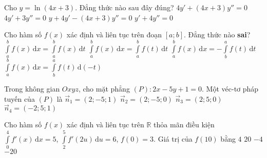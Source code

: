 \begin{ex}%
	Cho $y=\ln (4x+3)$. Đẳng thức nào sau đây đúng?
	\choice
	{\True $4y'+(4x+3)y''=0 $}
	{$4y'+3y''=0 $}
	{$y+4y'-(4x+3)y''=0 $}
	{$y'+4y''=0 $}
\end{ex}
\begin{ex}%
	Cho hàm số $f(x)$ xác định và liên tục trên đoạn $[a;b]$. Đẳng thức nào \textbf{sai}?
	\choice
	{\True $\displaystyle\int\limits_a^b f(x) \mathrm{\,d}x=\int\limits_a^b f(x) \mathrm{\,d}t $}
	{$\displaystyle\int\limits_a^b f(x) \mathrm{\,d}x=\int\limits_a^b f(t) \mathrm{\,d}t $}
	{$\displaystyle\int\limits_a^b f(x) \mathrm{\,d}x=-\int\limits_b^a f(t) \mathrm{\,d}t $}
	{$\displaystyle\int\limits_a^b f(x) \mathrm{\,d}x=\int\limits_b^a f(t) \mathrm{\,d}(-t) $}
\end{ex}
\begin{ex}%
	Trong không gian $Oxyz$, cho mặt phẳng $(P)\colon 2x-5y+1=0$. Một véc-tơ pháp tuyến của $(P)$ là
	\choice
	{$\vec{n}_1=(2;-5;1) $}
	{\True $\vec{n}_2=(2;-5;0) $}
	{$\vec{n}_3=(2;5;0) $}
	{$\vec{n}_4=(-2;5;1) $}
\end{ex}
\begin{ex}%
	Cho hàm số $f(x)$ xác định và liên tục trên $\mathbb{R}$ thỏa mãn điều kiện $\displaystyle \int \limits_0^4 f'(x)\mathrm{\,d}x=5$, $\displaystyle \int \limits_2^5 f'(2u)\mathrm{\,d}u=6$, $f(0)=3$. Giá trị của $f(10)$ bằng
	\choice
	{$4 $}
	{\True $20 $}
	{$-4 $}
	{$-20 $}
\end{ex}
